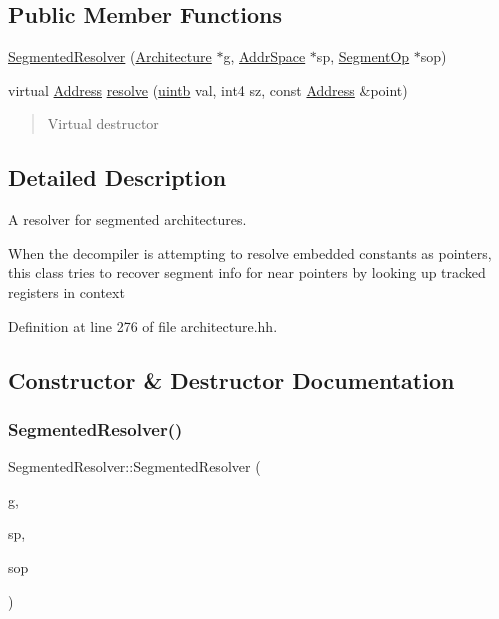 \subsection*{Public Member Functions}
\begin{DoxyCompactItemize}
\item 
\mbox{\hyperlink{class_segmented_resolver_ab1ab1799920f6045d3fba4388026293c}{Segmented\+Resolver}} (\mbox{\hyperlink{class_architecture}{Architecture}} $\ast$g, \mbox{\hyperlink{class_addr_space}{Addr\+Space}} $\ast$sp, \mbox{\hyperlink{class_segment_op}{Segment\+Op}} $\ast$sop)
\item 
virtual \mbox{\hyperlink{class_address}{Address}} \mbox{\hyperlink{class_segmented_resolver_aba359676c120311d4f388dd814296db7}{resolve}} (\mbox{\hyperlink{types_8h_a2db313c5d32a12b01d26ac9b3bca178f}{uintb}} val, int4 sz, const \mbox{\hyperlink{class_address}{Address}} \&point)
\begin{DoxyCompactList}\small\item\em \begin{quote}
Virtual destructor\end{quote}
\end{DoxyCompactList}\end{DoxyCompactItemize}


\subsection{Detailed Description}
A resolver for segmented architectures. 

When the decompiler is attempting to resolve embedded constants as pointers, this class tries to recover segment info for near pointers by looking up tracked registers in context 

Definition at line 276 of file architecture.\+hh.



\subsection{Constructor \& Destructor Documentation}
\mbox{\label{class_segmented_resolver_ab1ab1799920f6045d3fba4388026293c}} 
\subsubsection{\texorpdfstring{SegmentedResolver()}{SegmentedResolver()}}
{\footnotesize\ttfamily Segmented\+Resolver\+::\+Segmented\+Resolver (\begin{DoxyParamCaption}\item[{\mbox{\hyperlink{class_architecture}{Architecture}} $\ast$}]{g,  }\item[{\mbox{\hyperlink{class_addr_space}{Addr\+Space}} $\ast$}]{sp,  }\item[{\mbox{\hyperlink{class_segment_op}{Segment\+Op}} $\ast$}]{sop }\end{DoxyParamCaption})\hspace{0.3cm}{\ttfamily [inline]}}

